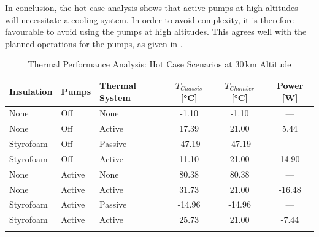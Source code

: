 In conclusion, the hot case analysis shows that active pumps at high altitudes will necessitate a cooling system. In order to avoid complexity, it is therefore favourable to avoid using the pumps at high altitudes. 
This agrees well with the planned operations for the pumps, as given in .

 


\begin{table}[H]
\centering
\caption{Thermal Performance Analysis: Hot Case Scenarios at 30\,km Altitude}
\label{tab:thermal results hot case}
\begin{tabular}{@{}lll S[table-format=-2.2] S[table-format=-2.2] S[table-format=-2.2]@{}}
\toprule
\textbf{Insulation} & \textbf{Pumps} & \textbf{Thermal System} & {$T_{Chassis}$ [\si{\celsius}]} & {$T_{Chamber}$ [\si{\celsius}]} & {Power [\si{W}]} \\ \midrule
None & Off & None & -1.10 & -1.10 & {---} \\
None & Off & Active & 17.39 & 21.00 & 5.44 \\ 
Styrofoam & Off & Passive & -47.19 & -47.19 & {---} \\
Styrofoam & Off & Active & 11.10 & 21.00 & 14.90 \\ \midrule
None & Active & None & 80.38 & 80.38 & {---} \\
None & Active & Active & 31.73 & 21.00 & -16.48 \\ 
Styrofoam & Active & Passive & -14.96 & -14.96 & {---} \\
Styrofoam & Active & Active & 25.73 & 21.00 & -7.44 \\ \bottomrule
\addlinespace
{}
\end{tabular}
\end{table}



